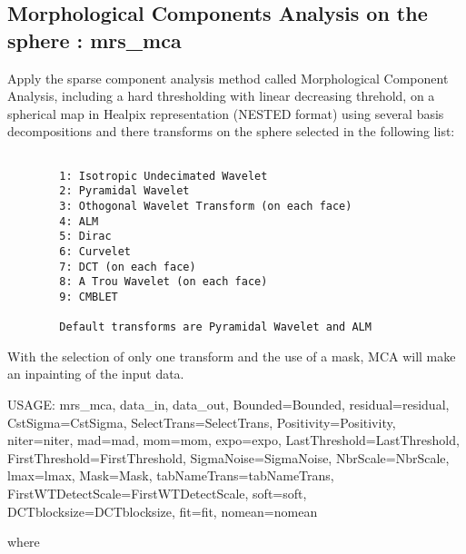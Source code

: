 \subsection{Morphological Components Analysis on the sphere : mrs\_mca}
Apply the sparse component analysis method called Morphological Component Analysis, including a hard thresholding 
with linear decreasing threhold, on a spherical map in Healpix representation (NESTED format) using several basis 
decompositions and there transforms on the sphere selected in the following list:
\begin{verbatim}

		1: Isotropic Undecimated Wavelet
		2: Pyramidal Wavelet
		3: Othogonal Wavelet Transform (on each face)
		4: ALM
		5: Dirac
		6: Curvelet
		7: DCT (on each face)
		8: A Trou Wavelet (on each face)
		9: CMBLET

		Default transforms are Pyramidal Wavelet and ALM

\end{verbatim}
With the selection of only one transform and the use of a mask, MCA will make an inpainting of the input data.
{\bf
\begin{center}
     USAGE: mrs\_mca, data\_in, data\_out, Bounded=Bounded, residual=residual, CstSigma=CstSigma, SelectTrans=SelectTrans, Positivity=Positivity, niter=niter, 
     mad=mad, mom=mom, expo=expo, LastThreshold=LastThreshold, FirstThreshold=FirstThreshold, SigmaNoise=SigmaNoise, NbrScale=NbrScale, lmax=lmax, 
     Mask=Mask, tabNameTrans=tabNameTrans, FirstWTDetectScale=FirstWTDetectScale, soft=soft, DCTblocksize=DCTblocksize, fit=fit, nomean=nomean
\end{center}}
where 
